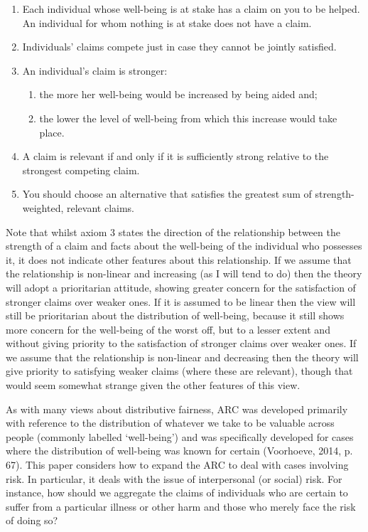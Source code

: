 \documentclass[man,11pt,a4paper]{apa7}
\begin{document}
\begin{enumerate}[label=\arabic*.]
\item Each individual whose well-being is at stake has a claim on you to be helped. An individual for whom nothing is at stake does not have a claim.
\item Individuals' claims compete just in case they cannot be jointly satisfied.
\item An individual's claim is stronger:
\begin{enumerate}[label=\alph*.]
\item the more her well-being would be increased by being aided and;
\item the lower the level of well-being from which this increase would take place.
\end{enumerate}
\item A claim is relevant if and only if it is sufficiently strong relative to the strongest competing claim.
\item You should choose an alternative that satisfies the greatest sum of strength-weighted, relevant claims.
\end{enumerate}

Note that whilst axiom 3 states the direction of the relationship between the strength of a claim and facts about the well-being of the individual who possesses it, it does not indicate other features about this relationship. If we assume that the relationship is non-linear and increasing (as I will tend to do) then the theory will adopt a prioritarian attitude, showing greater concern for the satisfaction of stronger claims over weaker ones. If it is assumed to be linear then the view will still be prioritarian about the distribution of well-being, because it still shows more concern for the well-being of the worst off, but to a lesser extent and without giving priority to the satisfaction of stronger claims over weaker ones. If we assume that the relationship is non-linear and decreasing then the theory will give priority to satisfying weaker claims (where these are relevant), though that would seem somewhat strange given the other features of this view.

As with many views about distributive fairness, ARC was developed primarily with reference to the distribution of whatever we take to be valuable across people (commonly labelled `well-being') and was specifically developed for cases where the distribution of well-being was known for certain (Voorhoeve, 2014, p. 67). This paper considers how to expand the ARC to deal with cases involving risk. In particular, it deals with the issue of interpersonal (or social) risk. For instance, how should we aggregate the claims of individuals who are certain to suffer from a particular illness or other harm and those who merely face the risk of doing so?
\end{document}
